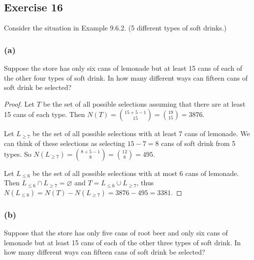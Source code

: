 \documentclass[14pt]{extarticle}
\newcommand{\es}{\varnothing}
\begin{document}
\subsection{Exercise 16}
Consider the situation in Example 9.6.2. (5 different types of soft drinks.)

\subsubsection{(a)}
Suppose the store has only six cans of lemonade but at least 15 cans of each of the other four types of soft drink. In how
many different ways can fifteen cans of soft drink be selected?

\begin{proof}
     Let \(T\) be the set of all possible selections assuming that there are at least 15 cans of each type. Then \(N(T) =
     \binom{15+5-1}{15} = \binom{19}{15} = 3876\).

     Let \(L_{\geq 7}\) be the set of all possible selections with at least 7 cans of lemonade. We can think of these selections
     as selecting \(15-7=8\) cans of soft drink from 5 types. So \(N(L_{\geq 7}) = \binom{8+5-1}{8} = \binom{12}{8} = 495\).

     Let \(L_{\leq 6}\) be the set of all possible selections with at most 6 cans of lemonade. Then \(L_{\leq 6} \cap L_{\geq 7}
     = \es\) and \(T = L_{\leq 6} \cup L_{\geq 7}\), thus \(N(L_{\leq 6}) = N(T) - N(L_{\geq 7}) = 3876 - 495 = 3381\).
\end{proof}

\subsubsection{(b)}
Suppose that the store has only five cans of root beer and only six cans of lemonade but at least 15 cans of each of the
other three types of soft drink. In how many different ways can fifteen cans of soft drink be selected?
\end{document}
